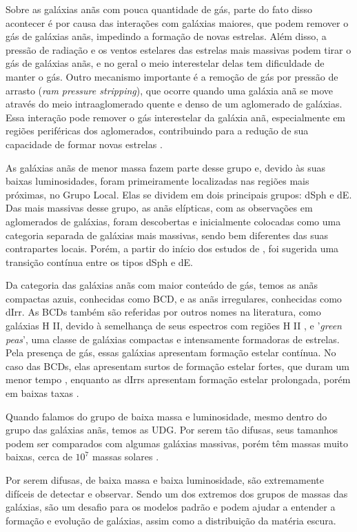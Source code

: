 Sobre as galáxias anãs com pouca quantidade de gás, parte do fato disso acontecer é por causa das interações com galáxias maiores, que podem remover o gás de galáxias anãs, impedindo a formação de novas estrelas. Além disso, a pressão de radiação e os ventos estelares das estrelas mais massivas podem tirar o gás de galáxias anãs, e no geral o meio interestelar delas tem dificuldade de manter o gás. Outro mecanismo importante é a remoção de gás por pressão de arrasto (\textit{ram pressure stripping}), que ocorre quando uma galáxia anã se move através do meio intraaglomerado quente e denso de um aglomerado de galáxias. Essa interação pode remover o gás interestelar da galáxia anã, especialmente em regiões periféricas dos aglomerados, contribuindo para a redução de sua capacidade de formar novas estrelas .

As galáxias anãs de menor massa fazem parte desse grupo e, devido às suas baixas luminosidades, foram primeiramente localizadas nas regiões mais próximas, no Grupo Local. Elas se dividem em dois principais grupos: \ac{dSph} e \ac{dE}. Das mais massivas desse grupo, as anãs elípticas, com as observações em aglomerados de galáxias, foram descobertas e inicialmente colocadas como uma categoria separada de galáxias mais massivas, sendo bem diferentes das suas contrapartes locais. Porém, a partir do início dos estudos de \cite{Forbes_2011}, foi sugerida uma transição contínua entre os tipos \ac{dSph} e \ac{dE}.

Da categoria das galáxias anãs com maior conteúdo de gás, temos as anãs compactas azuis, conhecidas como \ac{BCD}, e as anãs irregulares, conhecidas como \ac{dIrr}. As BCDs também são referidas por outros nomes na literatura, como galáxias H II, devido à semelhança de seus espectros com regiões H II , e '\textit{green peas}', uma classe de galáxias compactas e intensamente formadoras de estrelas. Pela presença de gás, essas galáxias apresentam formação estelar contínua. No caso das BCDs, elas apresentam surtos de formação estelar fortes, que duram um menor tempo , enquanto as dIrrs apresentam formação estelar prolongada, porém em baixas taxas \citep{McQuinn2010}.


Quando falamos do grupo de baixa massa e luminosidade, mesmo dentro do grupo das galáxias anãs, temos as \ac{UDG}. Por serem tão difusas, seus tamanhos podem ser comparados com algumas galáxias massivas, porém têm massas muito baixas, cerca de $10^7$ massas solares \citep{van_Dokkum2015}. 

Por serem difusas, de baixa massa e baixa luminosidade, são extremamente difíceis de detectar e observar. Sendo um dos extremos dos grupos de massas das galáxias, são um desafio para os modelos padrão e podem ajudar a entender a formação e evolução de galáxias, assim como a distribuição da matéria escura.

